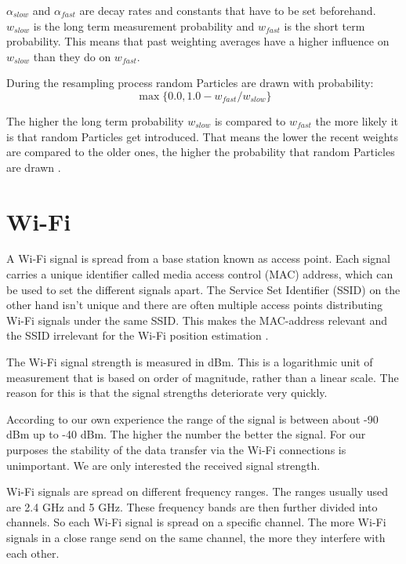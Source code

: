 $\alpha_{slow}$ and $\alpha_{fast}$ are decay rates and constants that have to be set beforehand. $w_{slow}$ is the long term measurement probability and $w_{fast}$ is the short term probability. This means that past weighting averages have a higher influence on $w_{slow}$ than they do on $w_{fast}$. 

During the resampling process random \gls{Particle}s are drawn with probability:
\begin{equation}\label{eq:quality}
\max\{0.0, 1.0-w_{fast}/w_{slow}\}
\end{equation}

The higher the long term probability $w_{slow}$ is compared to $w_{fast}$ the more likely it is that random \gls{Particle}s get introduced. That means the lower the recent weights are compared to the older ones, the higher the probability that random \gls{Particle}s are drawn \citep[p.\ 258-259]{Thrun:2005:PR:1121596}.
\section{Wi-Fi}\label{sec:wifi}
A Wi-Fi signal is spread from a base station known as access point. Each signal carries a unique identifier called media access control (MAC) address, which can be used to set the different signals apart. The Service Set Identifier (\Gls{SSID}) on the other hand isn't unique and there are often multiple access points distributing Wi-Fi signals under the same \Gls{SSID}. This makes the \Gls{MAC-address} relevant and the \Gls{SSID} irrelevant for the Wi-Fi position estimation \citep{ieee802.11-2012}.

The Wi-Fi signal strength is measured in dBm. This is a logarithmic unit of measurement that is based on order of magnitude, rather than a linear scale. The reason for this is that the signal strengths deteriorate very quickly. 

According to our own experience the range of the signal is between about -90 dBm up to -40 dBm. The higher the number the better the signal. For our purposes the stability of the data transfer via the Wi-Fi connections is unimportant. We are only interested the received signal strength.

Wi-Fi signals are spread on different frequency ranges. The ranges usually used are 2.4 GHz and 5 GHz. These frequency bands are then further divided into channels. So each Wi-Fi signal is spread on a specific channel. The more Wi-Fi signals in a close range send on the same channel, the more they interfere with each other. 

